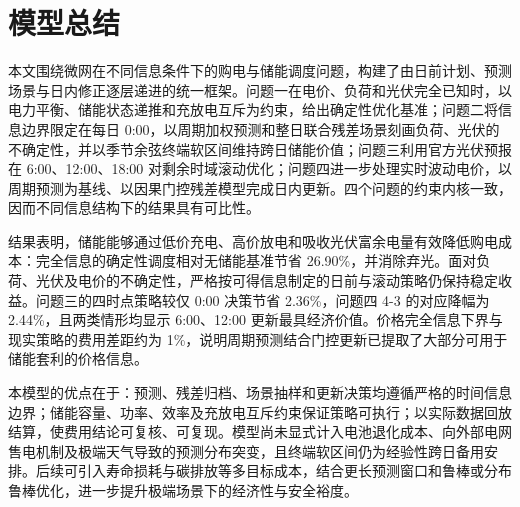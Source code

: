 \section{模型总结}

本文围绕微网在不同信息条件下的购电与储能调度问题，构建了由日前计划、预测场景与日内修正逐层递进的统一框架。问题一在电价、负荷和光伏完全已知时，以电力平衡、储能状态递推和充放电互斥为约束，给出确定性优化基准；问题二将信息边界限定在每日 0:00，以周期加权预测和整日联合残差场景刻画负荷、光伏的不确定性，并以季节余弦终端软区间维持跨日储能价值；问题三利用官方光伏预报在 6:00、12:00、18:00 对剩余时域滚动优化；问题四进一步处理实时波动电价，以周期预测为基线、以因果门控残差模型完成日内更新。四个问题的约束内核一致，因而不同信息结构下的结果具有可比性。

结果表明，储能能够通过低价充电、高价放电和吸收光伏富余电量有效降低购电成本：完全信息的确定性调度相对无储能基准节省 26.90\%，并消除弃光。面对负荷、光伏及电价的不确定性，严格按可得信息制定的日前与滚动策略仍保持稳定收益。问题三的四时点策略较仅 0:00 决策节省 2.36\%，问题四 4-3 的对应降幅为 2.44\%，且两类情形均显示 6:00、12:00 更新最具经济价值。价格完全信息下界与现实策略的费用差距约为 1\%，说明周期预测结合门控更新已提取了大部分可用于储能套利的价格信息。

本模型的优点在于：预测、残差归档、场景抽样和更新决策均遵循严格的时间信息边界；储能容量、功率、效率及充放电互斥约束保证策略可执行；以实际数据回放结算，使费用结论可复核、可复现。模型尚未显式计入电池退化成本、向外部电网售电机制及极端天气导致的预测分布突变，且终端软区间仍为经验性跨日备用安排。后续可引入寿命损耗与碳排放等多目标成本，结合更长预测窗口和鲁棒或分布鲁棒优化，进一步提升极端场景下的经济性与安全裕度。
